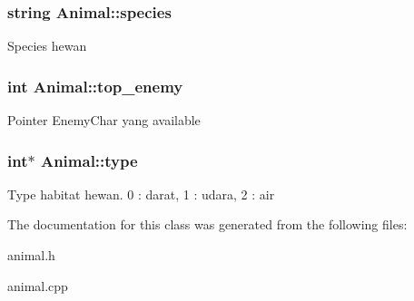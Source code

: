 \subsubsection[{\texorpdfstring{species}{species}}]{\setlength{\rightskip}{0pt plus 5cm}string Animal\+::species\hspace{0.3cm}{\ttfamily [protected]}}\hypertarget{class_animal_a70a223fc101b56962088b16a8b18534b}{}\label{class_animal_a70a223fc101b56962088b16a8b18534b}
Species hewan 
\subsubsection[{\texorpdfstring{top\+\_\+enemy}{top_enemy}}]{\setlength{\rightskip}{0pt plus 5cm}int Animal\+::top\+\_\+enemy\hspace{0.3cm}{\ttfamily [protected]}}\hypertarget{class_animal_a6620fb4081b171927278a00638d8d2d9}{}\label{class_animal_a6620fb4081b171927278a00638d8d2d9}
Pointer Enemy\+Char yang available 
\subsubsection[{\texorpdfstring{type}{type}}]{\setlength{\rightskip}{0pt plus 5cm}int$\ast$ Animal\+::type\hspace{0.3cm}{\ttfamily [protected]}}\hypertarget{class_animal_a0f113636c4f0a8ad73b1eba947a2e8e2}{}\label{class_animal_a0f113636c4f0a8ad73b1eba947a2e8e2}
Type habitat hewan. 0 \+: darat, 1 \+: udara, 2 \+: air 

The documentation for this class was generated from the following files\+:\begin{DoxyCompactItemize}
\item 
animal.\+h\item 
animal.\+cpp\end{DoxyCompactItemize}

